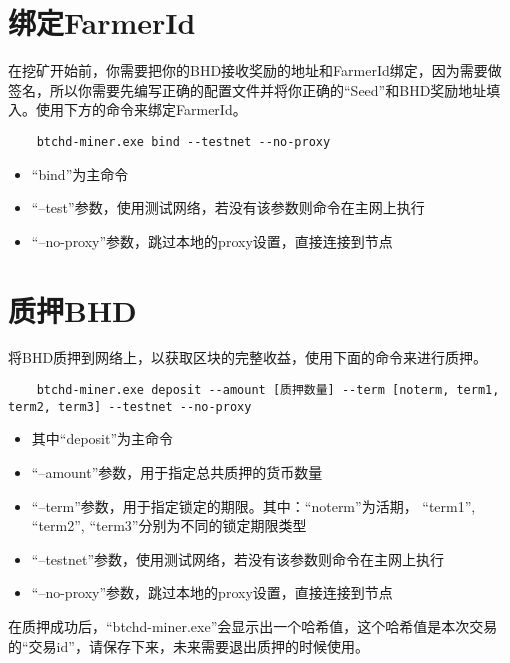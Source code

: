 \section{绑定FarmerId}
\begin{flushleft}
    在挖矿开始前，你需要把你的BHD接收奖励的地址和FarmerId绑定，因为需要做签名，所以你需要先编写正确的配置文件并将你正确的``Seed''和BHD奖励地址填入。使用下方的命令来绑定FarmerId。
\end{flushleft}
\scriptsize
\begin{verbatim}
    btchd-miner.exe bind --testnet --no-proxy
\end{verbatim}
\normalsize
\begin{itemize}
    \item ``bind''为主命令
    \item ``--test''参数，使用测试网络，若没有该参数则命令在主网上执行
    \item ``--no-proxy''参数，跳过本地的proxy设置，直接连接到节点
\end{itemize}
\section{质押BHD}
\begin{flushleft}
    将BHD质押到网络上，以获取区块的完整收益，使用下面的命令来进行质押。
\end{flushleft}
\scriptsize
\begin{verbatim}
    btchd-miner.exe deposit --amount [质押数量] --term [noterm, term1, term2, term3] --testnet --no-proxy
\end{verbatim}
\normalsize
\begin{itemize}
    \item 其中``deposit''为主命令
    \item ``--amount''参数，用于指定总共质押的货币数量
    \item ``--term''参数，用于指定锁定的期限。其中：``noterm''为活期， ``term1'', ``term2'', ``term3''分别为不同的锁定期限类型
    \item ``--testnet''参数，使用测试网络，若没有该参数则命令在主网上执行
    \item ``--no-proxy''参数，跳过本地的proxy设置，直接连接到节点
\end{itemize}
\begin{flushleft}
    在质押成功后，``btchd-miner.exe''会显示出一个哈希值，这个哈希值是本次交易的``交易id''，请保存下来，未来需要退出质押的时候使用。
\end{flushleft}
